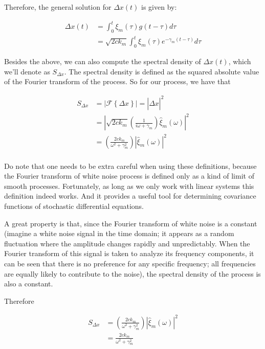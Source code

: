 Therefore, the general solution for $\Delta x(t)$ is given by:

\begin{align*}
\Delta x(t) &= \int_0^t \xi_m(\tau)g(t-\tau)d\tau\\
&= \sqrt{2ck_m}\int_0^t \xi_m(\tau)e^{-\gamma_m(t-\tau)}d\tau
\end{align*}

Besides the above, we can also compute the spectral density of $\Delta x(t)$, which we'll denote as $S_{\Delta x}$. The spectral density is defined as the squared absolute value of the Fourier transform of the process. So for our process, we have that

\begin{align*}
S_{\Delta x} &= \left|\mathcal{F}\left\{\Delta x\right\}\right| = \left|\hat{\Delta x}\right|^2\\
&= \left|\sqrt{2ck_m}\left(\frac{1}{i\omega+\gamma_m}\right)\hat{\xi}_m(\omega)\right|^2\\
&= \left(\frac{2ck_m}{\omega^2+\gamma_m^2}\right)\left|\hat{\xi}_m(\omega)\right|^2\\
\end{align*}

Do note that one needs to be extra careful when using these definitions, because the Fourier transform of white noise process is defined only as a kind of limit of smooth processes. Fortunately, as long as we only work with linear systems this definition indeed works. And it provides a useful tool for determining covariance functions of stochastic differential equations.

A great property is that, since the Fourier transform of white noise is a constant (imagine a white noise signal in the time domain; it appears as a random fluctuation where the amplitude changes rapidly and unpredictably. When the Fourier transform of this signal is taken to analyze its frequency components, it can be seen that there is no preference for any specific frequency; all frequencies are equally likely to contribute to the noise), the spectral density of the process is also a constant.

Therefore

\begin{align*}
S_{\Delta x} &= \left(\frac{2ck_m}{\omega^2+\gamma_m^2}\right)\left|\hat{\xi}_m(\omega)\right|^2\\
&= \frac{2ck_m}{\omega^2+\gamma_m^2}\\
\end{align*}


